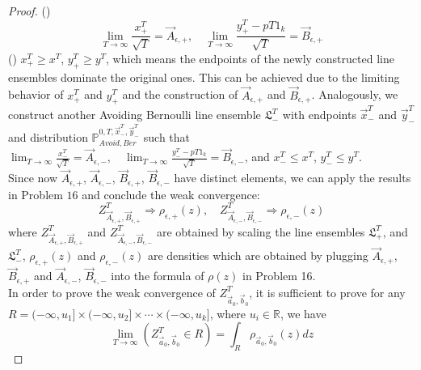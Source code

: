 \begin{proof}
()$$\lim_{T\rightarrow\infty}\frac{x^{T}_{+}}{\sqrt{T}}=\vec{A}_{\epsilon,+},\quad \lim_{T\rightarrow\infty}\frac{y^{T}_{+}-pT1_{k}}{\sqrt{T}}=\vec{B}_{\epsilon,+}$$
() $x^{T}_{+}\geqslant x^{T}$, $y^{T}_{+}\geqslant y^{T}$, which means the endpoints of the newly constructed line ensembles dominate the original ones. This can be achieved due to the limiting behavior of $x^{T}_{+}$ and $y^{T}_{+}$ and the construction of $\vec{A}_{\epsilon,+}$ and $\vec{B}_{\epsilon,+}$.
Analogously, we construct another Avoiding Bernoulli line ensemble $\mathfrak{L}_{-}^{T}$ with endpoints $\vec{x}^{T}_{-}$ and $\vec{y}^{T}_{-}$ and distribution $\mathbb{P}_{Avoid,Ber}^{0,T,\vec{x}^{T}_{-},\vec{y}^{T}_{-}}$ such that $\lim_{T\rightarrow\infty}\frac{x^{T}_{-}}{\sqrt{T}}=\vec{A}_{\epsilon,-},\quad \lim_{T\rightarrow\infty}\frac{y^{T}_{-}-pT1_{k}}{\sqrt{T}}=\vec{B}_{\epsilon,-}$, and $x^{T}_{-}\leqslant x^{T}$, $y^{T}_{-}\leqslant y^{T}$.\\
Since now $\vec{A}_{\epsilon,+}$, $\vec{A}_{\epsilon,-}$, $\vec{B}_{\epsilon, +}$, $\vec{B}_{\epsilon,-}$ have distinct elements, we can apply the results in Problem $16$ and conclude the weak convergence:
$$Z^{T}_{\vec{A}_{\epsilon,+}, \vec{B}_{\epsilon, +}}\Rightarrow \rho_{\epsilon,+}(z),\quad Z^{T}_{\vec{A}_{\epsilon,-}, \vec{B}_{\epsilon, -}}\Rightarrow \rho_{\epsilon,-}(z)$$
where $Z^{T}_{\vec{A}_{\epsilon,+},\vec{B}_{\epsilon,+}}$ and $Z^{T}_{\vec{A}_{\epsilon,-},\vec{B}_{\epsilon,-}}$ are obtained by scaling the line ensembles $\mathfrak{L}_{+}^{T}$, and $\mathfrak{L}_{-}^{T}$, $\rho_{\epsilon,+}(z)$ and $\rho_{\epsilon,-}(z)$ are densities which are obtained by plugging $\vec{A}_{\epsilon,+}$, $\vec{B}_{\epsilon,+}$ and $\vec{A}_{\epsilon,-}$, $\vec{B}_{\epsilon,-}$ into the formula of $\rho(z)$ in Problem 16. \\
In order to prove the weak convergence of $Z^{T}_{\vec{a}_{0},\vec{b}_{0}}$, it is sufficient to prove for any $R=(-\infty,u_{1}]\times(-\infty,u_{2}]\times\cdots\times(-\infty,u_{k}]$, where $u_{i}\in\mathbb{R}$, we have $$\lim_{T\rightarrow\infty}(Z^{T}_{\vec{a}_{0},\vec{b}_{0}}\in R)=\int_{R}\rho_{\vec{a}_{0},\vec{b}_{0}}(z)dz$$

\end{proof}
